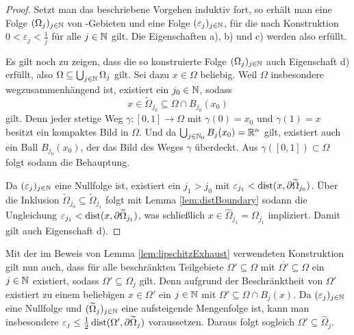 \begin{proof}
  Setzt man das beschriebene Vorgehen induktiv fort, so erhält man eine Folge $(\Omega_j)_{j \in \mathbb{N}}$ von \lipschitz\hyp{}Gebieten und eine Folge $(\varepsilon_j)_{j \in \mathbb{N}}$, für die nach Konstruktion $0 < \varepsilon_j < \tfrac{1}{j}$ für alle $j \in \mathbb{N}$ gilt.
  Die Eigenschaften a), b) und c) werden also erfüllt.

  Es gilt noch zu zeigen, dass die so konstruierte Folge $(\Omega_j)_{j \in \mathbb{N}}$ auch Eigenschaft d) erfüllt, also $ \Omega \subseteq \bigcup_{j \in \mathbb{N}} \Omega_j $ gilt.
  Sei dazu $x \in \Omega$ beliebig.
  Weil $\Omega$ insbesondere wegzusammenhängend ist, existiert ein $j_0 \in \mathbb{N}$, sodass
  $$
  x \in \widetilde\Omega_{j_0} \subseteq \Omega \cap B_{j_0}(x_0)
  $$
  gilt.
  Denn jeder stetige Weg $\gamma \colon [0,1] \to \Omega$ mit $\gamma(0) = x_0$ und $\gamma(1) = x$ besitzt ein kompaktes Bild in $\Omega$.
  Und da $\bigcup_{j \in \mathbb{N}_0} B_j(x_0) = \mathbb{R}^n$ gilt, existiert auch ein Ball $B_{j_0}(x_0)$, der das Bild des Weges $\gamma$ überdeckt.
  Aus $\gamma([0,1]) \subset \Omega$ folgt sodann die Behauptung.

  Da $(\varepsilon_j)_{j \in \mathbb{N}}$ eine Nullfolge ist, existiert ein $j_1 > j_0$ mit $\varepsilon_{j_1} < \operatorname{dist}(x, \partial\widetilde\Omega_{j_0})$.
  Über die Inklusion $\widetilde\Omega_{j_0} \subseteq \widetilde\Omega_{j_1}$ folgt mit Lemma \ref{lem:distBoundary} sodann die Ungleichung $\varepsilon_{j_1} < \operatorname{dist}(x,\partial\widetilde\Omega_{j_1})$, was schließlich $x \in \widehat\Omega_{j_1} = \Omega_{j_1}$ impliziert.
  Damit gilt auch Eigenschaft d).
\end{proof}

\begin{bemnumber}
  \label{bem:boundedSubset}
  Mit der im Beweis von Lemma \ref{lem:lipschitzExhaust} verwendeten Konstruktion gilt nun auch, dass für alle beschränkten Teilgebiete $\Omega' \subseteq \Omega$ mit $\overline{\Omega'} \subseteq \Omega$ ein $j \in \mathbb{N}$ existiert, sodass $\Omega' \subseteq \Omega_j$ gilt.
  Denn aufgrund der Beschränktheit von $\Omega'$ existiert zu einem beliebigen $x \in \Omega'$ ein $j \in \mathbb{N}$ mit $\Omega' \subseteq \Omega \cap B_j(x)$.
  Da $(\varepsilon_j)_{j \in \mathbb{N}}$ eine Nullfolge und $(\widetilde\Omega_j)_{j \in \mathbb{N}}$ eine aufsteigende Mengenfolge ist, kann man insbesondere $\varepsilon_j \leq \tfrac{1}{2} \operatorname{dist}(\Omega', \partial\widetilde\Omega_j)$ voraussetzen.
  Daraus folgt sogleich $\Omega' \subseteq \widehat\Omega_j$.
\end{bemnumber}

